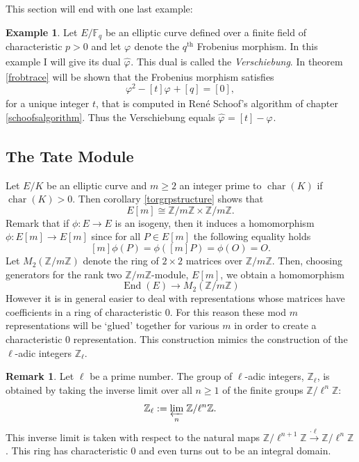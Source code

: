 \documentclass{article}
\numberwithin{equation}{section}
\theoremstyle{definition}
\newtheorem{example}[theorem]{Example}
\newtheorem{remark}[theorem]{Remark}
\newcommand{\ZZ}{{\mathbb Z}} %
\newcommand{\Zmod}[1]{\ZZ / #1\ZZ} %
\newcommand{\FF}[1]{{\mathbb F}_{#1}} %
\newcommand{\Char}[1]{\operatorname{char} (#1)} %
\newcommand{\frob}[1][]{\varphi_{#1}} %
\newcommand{\Endring}[1]{\operatorname{End} (#1)} %
\newcommand{\invlim}[1]{\underset{#1}{\varprojlim}} %
\begin{document}
This section will end with one last example:

\begin{example}
Let $E/\FF{q}$ be an elliptic curve defined over a finite field of characteristic $p>0$ and let $\frob$ denote the $q^\text{th}$ Frobenius morphism. In this example I will give its dual $\hat{\frob}$. This dual is called the \emph{Verschiebung}. In theorem \ref{frobtrace} will be shown that the Frobenius morphism satisfies $$\frob^2 -[t]\frob + [q] = [0],$$ for a unique integer $t$, that is computed in Ren\'e Schoof's algorithm of chapter \ref{schoofsalgorithm}. Thus the Verschiebung equals $\hat{\frob}=[t]-\frob$.
\end{example}





\subsection{The Tate Module}\label{tatemodule}
Let $E/K$ be an elliptic curve and $m \geq 2$ an integer prime to $\Char{K}$ if $\Char{K}>0$. Then corollary \ref{torgrpstructure} shows that $$E[m] \cong \Zmod{m} \times \Zmod{m}.$$
Remark that if $\phi: E \rightarrow E$ is an isogeny, then it induces a homomorphism $\phi: E[m] \rightarrow E[m]$ since for all $P \in E[m]$ the following equality holds $$[m] \phi(P) = \phi([m]P) = \phi(O)=O.$$ Let $M_2(\Zmod{m})$ denote the ring of $2 \times 2$ matrices over $\Zmod{m}$. Then, choosing generators for the rank two $\Zmod{m}$-module, $E[m]$, we obtain a homomorphism $$\Endring{E} \rightarrow M_2(\Zmod{m})$$ However it is in general easier to deal with representations whose matrices have coefficients in a ring of characteristic $0$. For this reason these mod $m$ representations will be `glued' together for various $m$ in order to create a characteristic $0$ representation. This construction mimics the construction of the $\ell$-adic integers $\ZZ_\ell$. 

\begin{remark}
Let $\ell$ be a prime number. The group of $\ell$-adic integers, $\ZZ_\ell$, is obtained by taking the inverse limit over all $n \geq 1$ of the finite groups $\Zmod{\ell^n}$: $$\ZZ_\ell:=\invlim{n}\; \Zmod{\ell^n}.$$ This inverse limit is taken with respect to the natural maps $\Zmod{\ell^{n+1}} \overset{\cdot \ell}{\longrightarrow} \Zmod{\ell^n}$. This ring has characteristic $0$ and even turns out to be an integral domain. 
\end{remark}
\end{document}
